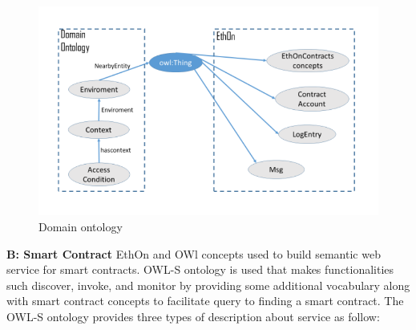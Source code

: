 \begin{center}
	\begin{figure}[htb!]
		
		\begin{minipage}{0.55\linewidth}
			\centering
			\includegraphics[width=1.95\textwidth]{images/chap02_Domain_EthOn.png}
		\end{minipage}
		\caption[Domain ONtology]{Domain ontology \cite{Baqa}}
		
	\end{figure}
	
\end{center} 

\textbf{B: Smart Contract}
EthOn and OWl concepts used to build semantic web service for smart contracts. OWL-S ontology is used that makes functionalities such discover, invoke, and monitor by providing some additional vocabulary along with smart contract concepts to facilitate query to finding a smart contract. The OWL-S ontology provides three types of description about service as follow: \\


